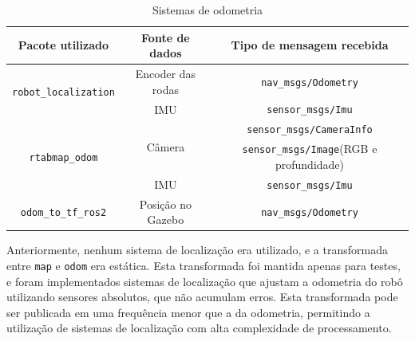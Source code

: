 \documentclass[repeatfields,xlists,xpacks,oneside,yearsonly]{ufrgscca}
\begin{document}

\begin{table}[h]
    \begin{center}
    \caption{Sistemas de odometria}
    \label{tab:odometria}
    \begin{tabular}{c|c|c}
    Pacote utilizado & Fonte de dados & Tipo de mensagem recebida \\
    \hline
    \multirow{2}{*}{\texttt{robot\_localization}} & Encoder das rodas & \texttt{nav\_msgs/Odometry}\\ 
                                                  & IMU	              & \texttt{sensor\_msgs/Imu}\\
    \hline
    \multirow{3}{*}{\texttt{rtabmap\_odom}} & \multirow{2}{*}{Câmera} & \texttt{sensor\_msgs/CameraInfo} \\
                                            &                               & \texttt{sensor\_msgs/Image}(RGB e profundidade) \\ 
                                            & IMU  & \texttt{sensor\_msgs/Imu}	\\
    \hline
    \texttt{odom\_to\_tf\_ros2} & Posição no Gazebo	& \texttt{nav\_msgs/Odometry} \\
    \end{tabular}
\end{center}
\end{table}

Anteriormente, nenhum sistema de localização era utilizado, e a transformada 
entre \texttt{map} e \texttt{odom} era estática.
Esta transformada foi mantida apenas para testes, e foram implementados sistemas
de localização que ajustam a odometria do robô utilizando sensores absolutos,
que não acumulam erros.
Esta transformada pode ser publicada em uma frequência menor que a da odometria,
permitindo a utilização de sistemas de localização com alta complexidade de 
processamento.
\end{document}
